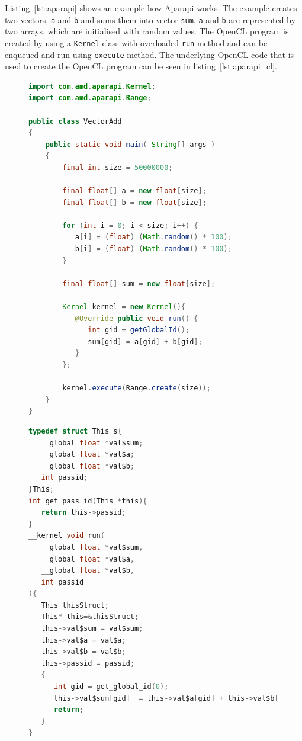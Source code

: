 \documentclass{l4proj}
\begin{document}
Listing~\ref{lst:aparapi} shows an example how Aparapi works. The example creates two 
vectors, \texttt{a} and \texttt{b} and sums them into vector \texttt{sum}. \texttt{a} and \texttt{b}
are represented by two arrays, which are initialised with random values. The OpenCL program
is created by using a \texttt{Kernel} class with overloaded \texttt{run} method and 
can be enqueued and run using \texttt{execute} method. The underlying OpenCL code that
is used to create the OpenCL program can be seen in listing~\ref{lst:aparapi_cl}.
\begin{figure}
  \begin{lstlisting}[language=Java]
import com.amd.aparapi.Kernel;
import com.amd.aparapi.Range;

public class VectorAdd 
{
    public static void main( String[] args )
    {
        final int size = 50000000;

        final float[] a = new float[size];
        final float[] b = new float[size];

        for (int i = 0; i < size; i++) {
           a[i] = (float) (Math.random() * 100);
           b[i] = (float) (Math.random() * 100);
        }

        final float[] sum = new float[size];

        Kernel kernel = new Kernel(){
           @Override public void run() {
              int gid = getGlobalId();
              sum[gid] = a[gid] + b[gid];
           }
        };
        
        kernel.execute(Range.create(size));
    }
}    
  \end{lstlisting}
\end{figure}

\begin{figure}
  \begin{lstlisting}[language=C]
typedef struct This_s{
   __global float *val$sum;
   __global float *val$a;
   __global float *val$b;
   int passid;
}This;
int get_pass_id(This *this){
   return this->passid;
}
__kernel void run(
   __global float *val$sum, 
   __global float *val$a, 
   __global float *val$b, 
   int passid
){
   This thisStruct;
   This* this=&thisStruct;
   this->val$sum = val$sum;
   this->val$a = val$a;
   this->val$b = val$b;
   this->passid = passid;
   {
      int gid = get_global_id(0);
      this->val$sum[gid]  = this->val$a[gid] + this->val$b[gid];
      return;
   }
}   
  \end{lstlisting}
\end{figure}
\end{document}

